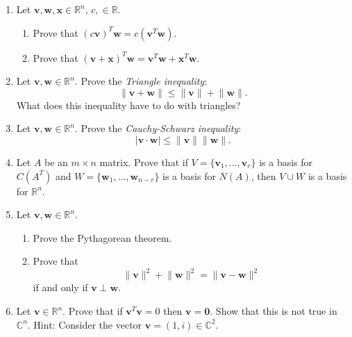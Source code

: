 \documentclass[11pt]{article}
\newcommand{\R}{\ensuremath{\mathbb R}}
\newcommand{\C}{\ensuremath{\mathbb C}}
\renewcommand{\vec}[1]{\ensuremath{\mathbf{#1}}}
\begin{document}
\begin{enumerate}
\item Let $\vec{v}, \vec{w}, \vec{x} \in \R^n$, $c, \in \R$. 
\begin{enumerate}
\item Prove that $(c\vec{v})^T\vec{w}= c(\vec{v}^T\vec{w})$.
\item Prove that $(\vec{v} + \vec{x})^T\vec{w}= \vec{v}^T\vec{w} + \vec{x}^T\vec{w}$.
\end{enumerate}

\item Let $\vec{v}, \vec{w} \in \R^n$. Prove the \textit{Triangle inequality}:
\[ \lVert \vec{v} + \vec{w} \rVert \le \lVert \vec{v} \rVert + \lVert \vec{w} \rVert.\]
What does this inequality have to do with triangles?

\item Let $\vec{v}, \vec{w} \in \R^n$. Prove the \textit{Cauchy-Schwarz inequality}:
\[  | \vec{v} \cdot \vec{w} |\le \lVert \vec{v} \rVert  \lVert \vec{w} \rVert.\]

\item Let $A$ be an $m \times n$ matrix.  Prove that if $V= \{\vec{v}_1, \ldots, \vec{v}_r\}$ is a basis for $C(A^T)$ and $W= \{\vec{w}_1, \ldots, \vec{w}_{n-r}\}$ is a basis for $N(A)$, then $V \cup W$ is a basis for $\R^n$.

\item Let $\vec{v},\vec{w} \in \R^n$.
\begin{enumerate}
\item Prove the Pythagorean theorem.
\item Prove that 
\[ \lVert \vec{v} \rVert^2 + \lVert \vec{w} \rVert^2 = \lVert \vec{v} - \vec{w} \rVert^2\]
if and only if $\vec{v} \perp \vec{w}$.
\end{enumerate}


 \item Let $\vec{v} \in \R^n$. Prove that if $\vec{v}^T\vec{v} = 0$ then $\vec{v} = \vec{0}$. Show that this is not true in $\C^n$.  Hint: Consider the vector $\vec{v} = (1,i) \in \C^2$.


\end{enumerate}
\end{document}
